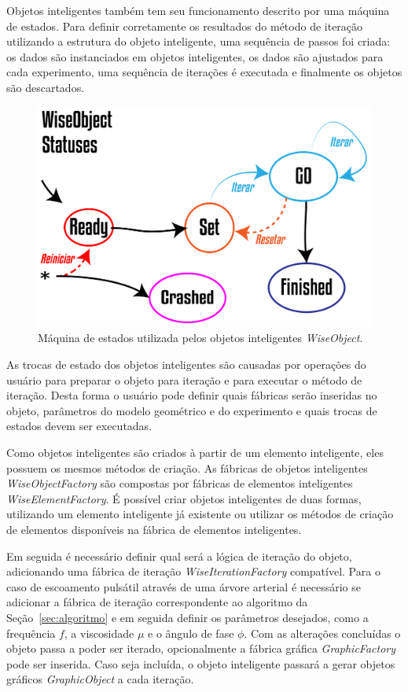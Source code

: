 \documentclass[a4paper,12pt]{monografia}
\theoremstyle{plain}
\theoremstyle{definition}
\theoremstyle{remark}
\begin{document}
Objetos inteligentes também tem seu funcionamento descrito por uma máquina de estados. Para definir corretamente os resultados do método de iteração utilizando a estrutura do objeto inteligente, uma sequência de passos foi criada: os dados são instanciados em objetos inteligentes, os dados são ajustados para cada experimento, uma sequência de iterações é executada e finalmente os objetos são descartados.

\begin{figure}[!htbp]
	\centering
	\includegraphics[scale=2]{Figures/WiseObjectStatus@16x.png}
	\caption{Máquina de estados utilizada pelos objetos inteligentes \textit{WiseObject}.}
	\label{fig7:wiseobjectstatuses}
\end{figure}

As trocas de estado dos objetos inteligentes são causadas por operações do usuário para preparar o objeto para iteração e para executar o método de iteração. Desta forma o usuário pode definir quais fábricas serão inseridas no objeto, parâmetros do modelo geométrico e do experimento e quais trocas de estados devem ser executadas.

Como objetos inteligentes são criados à partir de um elemento inteligente, eles possuem os mesmos métodos de criação. As fábricas de objetos inteligentes \textit{WiseObjectFactory} são compostas por fábricas de elementos inteligentes \textit{WiseElementFactory}. É possível criar objetos inteligentes de duas formas, utilizando um elemento inteligente já existente ou utilizar os métodos de criação de elementos disponíveis na fábrica de elementos inteligentes.

Em seguida é necessário definir qual será a lógica de iteração do objeto, adicionando uma fábrica de iteração \textit{WiseIterationFactory} compatível. Para o caso de escoamento pulsátil através de uma árvore arterial é necessário se adicionar a fábrica de iteração correspondente ao algoritmo da Seção~\ref{sec:algoritmo} e em seguida definir os parâmetros desejados, como a frequência $f$, a viscosidade $\mu$ e o ângulo de fase $\phi$. Com as alterações concluídas o objeto passa a poder ser iterado, opcionalmente a fábrica gráfica \textit{GraphicFactory} pode ser inserida. Caso seja incluída, o objeto inteligente passará a gerar objetos gráficos \textit{GraphicObject} a cada iteração.
\end{document}
